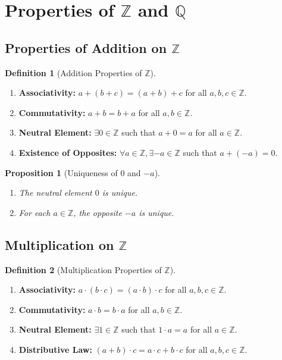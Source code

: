 \documentclass[9pt]{article}
\theoremstyle{definition}
\newtheorem{definition}{Definition}
\theoremstyle{plain}
\newtheorem{proposition}{Proposition}
\begin{document}
\section*{Properties of \( \mathbb{Z} \) and \( \mathbb{Q} \)}
\subsection*{Properties of Addition on \( \mathbb{Z} \)}
\begin{definition}[Addition Properties of \( \mathbb{Z} \)]
\leavevmode
\begin{enumerate}[label=(A\arabic*)]
    \item \textbf{Associativity:} \( a + (b + c) = (a + b) + c \) for all \( a, b, c \in \mathbb{Z} \).
    \item \textbf{Commutativity:} \( a + b = b + a \) for all \( a, b \in \mathbb{Z} \).
    \item \textbf{Neutral Element:} \( \exists 0 \in \mathbb{Z} \) such that \( a + 0 = a \) for all \( a \in \mathbb{Z} \).
    \item \textbf{Existence of Opposites:} \( \forall a \in \mathbb{Z}, \exists -a \in \mathbb{Z} \) such that \( a + (-a) = 0 \).
\end{enumerate}
\end{definition}

\begin{proposition}[Uniqueness of \( 0 \) and \( -a \)]
\begin{enumerate}
    \item The neutral element \( 0 \) is unique.
    \item For each \( a \in \mathbb{Z} \), the opposite \( -a \) is unique.
\end{enumerate}
\end{proposition}

\subsection*{Multiplication on \( \mathbb{Z} \)}
\begin{definition}[Multiplication Properties of \( \mathbb{Z} \)]
\leavevmode
\begin{enumerate}[label=(M\arabic*)]
    \item \textbf{Associativity:} \( a \cdot (b \cdot c) = (a \cdot b) \cdot c \) for all \( a, b, c \in \mathbb{Z} \).
    \item \textbf{Commutativity:} \( a \cdot b = b \cdot a \) for all \( a, b \in \mathbb{Z} \).
    \item \textbf{Neutral Element:} \( \exists 1 \in \mathbb{Z} \) such that \( 1 \cdot a = a \) for all \( a \in \mathbb{Z} \).
    \item \textbf{Distributive Law:} \( (a + b) \cdot c = a \cdot c + b \cdot c \) for all \( a, b, c \in \mathbb{Z} \).
\end{enumerate}
\end{definition}
\end{document}

